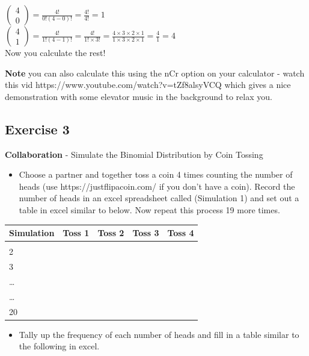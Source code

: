 \documentclass[
  10pt,
  letterpaper,
  DIV=11,
  numbers=noendperiod]{scrartcl}
\providecommand{\tightlist}{%
  \setlength{\itemsep}{0pt}\setlength{\parskip}{0pt}}\usepackage{longtable,booktabs,array}
\begin{document}
\(\left(\begin{matrix}4\\0\end{matrix}\right)=\frac{4!}{0!(4-0)!}=\frac{4!}{4!}=1\)\\
\(\left(\begin{matrix}4\\1\end{matrix}\right)=\frac{4!}{1!(4-1)!}=\frac{4!}{1!\times3!}=\frac{4\times3\times2\times1}{1\times3\times2\times1}=\frac{4}{1}=4\)\\

Now you calculate the rest!

\textbf{Note} you can also calculate this using the nCr option on your
calculator - watch this vid https://www.youtube.com/watch?v=tZf8alsyVCQ
which gives a nice demonstration with some elevator music in the
background to relax you.

\subsection{Exercise 3}\label{exercise-3}

\textbf{Collaboration} - Simulate the Binomial Distribution by Coin
Tossing

\begin{itemize}
\tightlist
\item
  Choose a partner and together toss a coin 4 times counting the number
  of heads (use https://justflipacoin.com/ if you don't have a coin).
  Record the number of heads in an excel spreadsheet called (Simulation
  1) and set out a table in excel similar to below. Now repeat this
  process 19 more times.\\
\end{itemize}

\begin{longtable}[]{@{}lllll@{}}
\toprule\noalign{}
Simulation & Toss 1 & Toss 2 & Toss 3 & Toss 4 \\
\midrule\noalign{}
\endhead
\bottomrule\noalign{}
\endlastfoot
1 & & & & \\
2 & & & & \\
3 & & & & \\
\ldots{} & & & & \\
\ldots{} & & & & \\
20 & & & & \\
\end{longtable}

\begin{itemize}
\tightlist
\item
  Tally up the frequency of each number of heads and fill in a table
  similar to the following in excel.
\end{itemize}
\end{document}
